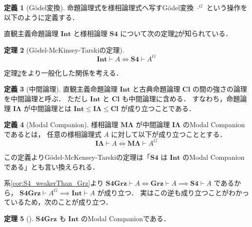 \documentclass{jsarticle}
\newcommand*{\Logic}[1]{\mathbf{#1}}
\newcommand*{\LogicGrz}{\Logic{Grz}}
\newcommand*{\LogicSFour}{\Logic{S4}}
\newcommand*{\LogicSFourGrz}{\Logic{S4Grz}}
\newcommand*{\LogicInt}{\Logic{Int}}
\newcommand*{\LogicCl}{\Logic{Cl}}
\theoremstyle{definition}
\newtheorem{theorem}{定理}[section]
\newtheorem{definition}[theorem]{定義}
\begin{document}
\begin{definition}[Gödel変換]
	命題論理式を様相論理式へ写すGödel変換 $\cdot^G$ という操作を以下のように定義する．
\end{definition}

直観主義命題論理 $\LogicInt$ と様相論理 $\LogicSFour$ について次の定理\ref{thm:GMT}が知られている．

\begin{theorem}[Gödel-McKinsey-Tarskiの定理\cite*{godel_interpretation_1933,mckinsey_theorems_1948}]\label{thm:GMT}
	\begin{equation*}
		\LogicInt \vdash A \iff \LogicSFour \vdash A^G
	\end{equation*}
\end{theorem}

定理\ref{thm:GMT}をより一般化した関係を考える．

\begin{definition}[中間論理]
	直観主義命題論理 $\LogicInt$ と古典命題論理 $\LogicCl$ の間の強さの論理を中間論理と呼ぶ．
	ただし $\LogicInt$ と $\LogicCl$ も中間論理に含める．
	すなわち，命題論理 $\Logic{I\Lambda}$ が中間論理とは $\LogicInt \leq \Logic{I\Lambda} \leq \LogicCl$ が成り立つことである．
\end{definition}

\begin{definition}[Modal Companion]
	様相論理 $\Logic{M\Lambda}$ が中間論理 $\Logic{I\Lambda}$ のModal Companionであるとは，
	任意の様相論理式 $A$ に対して以下が成り立つこととする．
	\begin{equation*}
		\Logic{I\Lambda} \vdash A \iff \Logic{M\Lambda} \vdash A^G
	\end{equation*}
\end{definition}

この定義よりGödel-McKensey-Tarskiの定理は「$\LogicSFour$ は $\LogicInt$ のModal Companionである」とも言い換えられる．


系\ref{cor:S4_weakerThan_Grz}より $\LogicSFourGrz \vdash A \iff \LogicGrz \vdash A \implies \LogicSFour \vdash A$ であるから，
$\LogicSFourGrz \vdash A^G \implies \LogicInt \vdash A$ が成り立つ．
実はこの逆も成り立つことがわかっているため，次のことが成り立つ．

\begin{theorem}[\cite*{grzegorczyk_relational_1969}]
	$\LogicSFourGrz$ も $\LogicInt$ のModal Companionである．
\end{theorem}
\end{document}
